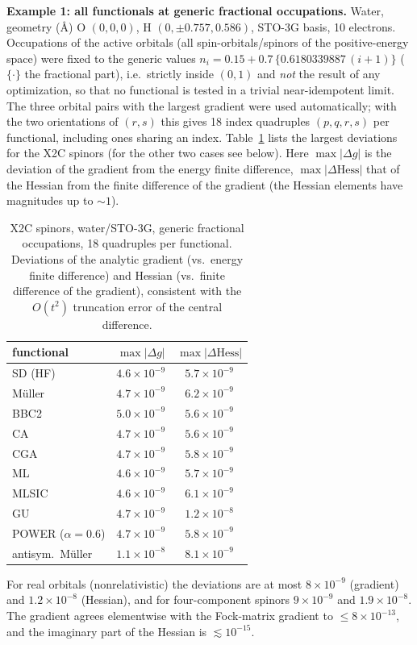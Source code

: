\documentclass[11pt]{article}
\begin{document}
\medskip
\noindent\textbf{Example 1: all functionals at generic fractional occupations.}
Water, geometry (\AA) O $(0,0,0)$, H $(0,\pm0.757,0.586)$, STO-3G basis, 10
electrons. Occupations of the active orbitals (all spin-orbitals/spinors of the
positive-energy space) were fixed to the generic values
$n_i=0.15+0.7\,\{0.6180339887\,(i+1)\}$ ($\{\cdot\}$ the fractional part),
i.e.\ strictly inside $(0,1)$ and \emph{not} the result of any optimization, so
that no functional is tested in a trivial near-idempotent limit. The three
orbital pairs with the largest gradient were used automatically; with the two
orientations of $(r,s)$ this gives 18 index quadruples $(p,q,r,s)$ per
functional, including ones sharing an index. Table~\ref{tab:val} lists the
largest deviations for the X2C spinors (for the other two cases see below).
Here $\max|\Delta g|$ is the deviation of the gradient from the energy
finite difference, $\max|\Delta\mathrm{Hess}|$ that of the Hessian from the
finite difference of the gradient (the Hessian elements have magnitudes up to
$\sim 1$).
\begin{table}[h]
\centering
\begin{tabular}{lcc}
\hline
functional & $\max|\Delta g|$ & $\max|\Delta \mathrm{Hess}|$ \\
\hline
SD (HF)      & $4.6\times10^{-9}$ & $5.7\times10^{-9}$ \\
M\"uller     & $4.7\times10^{-9}$ & $6.2\times10^{-9}$ \\
BBC2         & $5.0\times10^{-9}$ & $5.6\times10^{-9}$ \\
CA           & $4.7\times10^{-9}$ & $5.6\times10^{-9}$ \\
CGA          & $4.7\times10^{-9}$ & $5.8\times10^{-9}$ \\
ML           & $4.6\times10^{-9}$ & $5.7\times10^{-9}$ \\
MLSIC        & $4.6\times10^{-9}$ & $6.1\times10^{-9}$ \\
GU           & $4.7\times10^{-9}$ & $1.2\times10^{-8}$ \\
POWER ($\alpha=0.6$) & $4.7\times10^{-9}$ & $5.8\times10^{-9}$ \\
antisym.\ M\"uller & $1.1\times10^{-8}$ & $8.1\times10^{-9}$ \\
\hline
\end{tabular}
\caption{X2C spinors, water/STO-3G, generic fractional occupations, 18
quadruples per functional. Deviations of the analytic gradient (vs.\ energy
finite difference) and Hessian (vs.\ finite difference of the gradient),
consistent with the $O(t^2)$ truncation error of the central difference.}
\label{tab:val}
\end{table}
For real orbitals (nonrelativistic) the deviations are at most $8\times10^{-9}$
(gradient) and $1.2\times10^{-8}$ (Hessian), and for four-component spinors
$9\times10^{-9}$ and $1.9\times10^{-8}$. The gradient agrees elementwise with the
Fock-matrix gradient to $\le 8\times10^{-13}$, and the imaginary part of the
Hessian is $\lesssim10^{-15}$.
\end{document}
